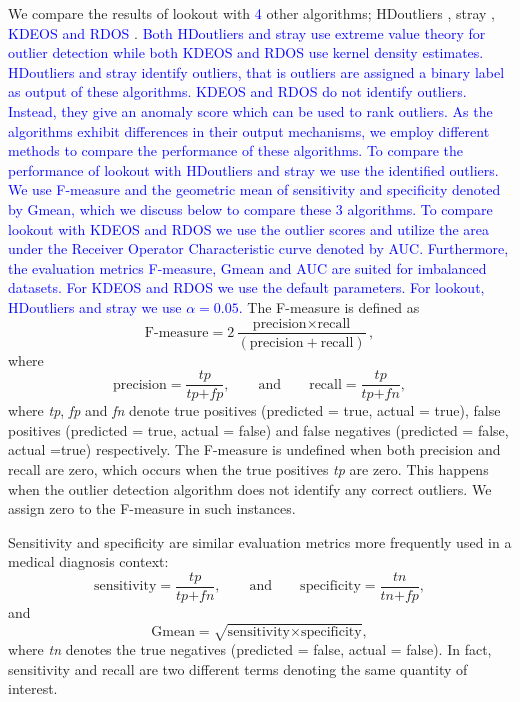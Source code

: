 \documentclass[12pt]{article}
\theoremstyle{definition}
\theoremstyle{definition}
\theoremstyle{definition}
\theoremstyle{remark}
\begin{document}
We compare the results of lookout with \textcolor{blue}{4} other algorithms; HDoutliers \citep{wilkinson2017visualizing}, stray \citep{stray}, \textcolor{blue}{KDEOS} \citep{Schubert2014} \textcolor{blue}{ and RDOS} \citep{Tang2017}. \textcolor{blue}{ Both HDoutliers and stray use extreme value theory for outlier detection while both KDEOS and RDOS use kernel density estimates. HDoutliers and stray identify outliers, that is outliers are assigned a binary label as output of these algorithms. KDEOS and RDOS do not identify outliers. Instead, they give an anomaly score which can be used to rank outliers. As the algorithms exhibit differences in their output mechanisms, we employ different methods to compare the performance of these algorithms. To compare the performance of lookout with HDoutliers and stray we use the identified outliers. We use F-measure and the geometric mean of sensitivity and specificity denoted by Gmean, which we discuss below to compare these 3 algorithms. To compare lookout with KDEOS and RDOS we use the outlier scores and utilize the area under the Receiver Operator Characteristic curve denoted by AUC. Furthermore, the evaluation metrics F-measure, Gmean and AUC are suited for imbalanced datasets. For KDEOS and RDOS we use the default parameters. For lookout, HDoutliers and stray we use $\alpha = 0.05$. } The F-measure is defined as
\begin{equation}\label{eq:fmeasure}
    \text{F-measure} = 2\frac{\text{precision} \times \text{recall}}{\left( \text{precision} + \text{recall} \right) }  ,
\end{equation}
where
\begin{equation}\label{eq:pr}
    \text{precision} = \frac{ \textit{tp} }{\textit{tp} + \textit{fp}}  , \qquad \text{and} \qquad \text{recall} = \frac{\textit{tp}}{\textit{tp} + \textit{fn}}  ,
\end{equation}
where \emph{tp}, \emph{fp} and \emph{fn} denote true positives (predicted = true, actual = true), false positives (predicted = true, actual = false) and false negatives (predicted = false, actual =true) respectively. The F-measure is undefined when both precision and recall are zero, which occurs when the true positives \emph{tp} are zero. This happens when the outlier detection algorithm does not identify any correct outliers. We assign zero to the F-measure in such instances.

Sensitivity and specificity are similar evaluation metrics more frequently used in a medical diagnosis context:
\begin{equation}\label{eq:ss}
    \text{sensitivity} = \frac{ \textit{tp} }{\textit{tp} + \textit{fn}}  , \qquad \text{and} \qquad \text{specificity} = \frac{\textit{tn}}{\textit{tn} + \textit{fp}}  ,
\end{equation}
and
\begin{equation}\label{eq:gmean}
    \text{Gmean} = \sqrt{ \text{sensitivity} \times \text{specificity}}  ,
\end{equation}
where \emph{tn} denotes the true negatives (predicted = false, actual = false). In fact, sensitivity and recall are two different terms denoting the same quantity of interest.
\end{document}
